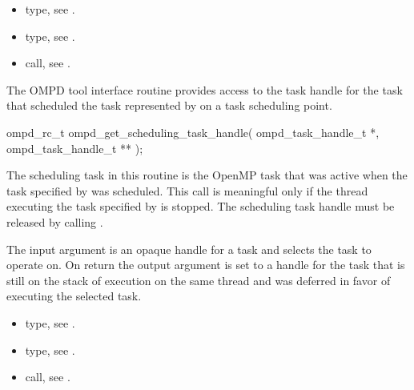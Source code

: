 \crossreferences
\begin{itemize}
  \item {} type, see .
	\item {} type, see .
	\item {} call, see 
	.
\end{itemize}


\label{subsubsubsec:ompd_get_scheduling_task_handle}
\summary
The OMPD tool interface routine  provides access to 
the task handle for the task that scheduled the task represented by  on 
a task scheduling point.

\format

\begin{cspecific}
\begin{ompSyntax}
ompd_rc_t ompd_get_scheduling_task_handle(
  ompd_task_handle_t *,
  ompd_task_handle_t **
);
\end{ompSyntax}
\end{cspecific}


\descr
The scheduling task in this routine is the OpenMP task that was active when
the task specified by  was scheduled. 
This call is meaningful only if the thread executing the task specified
by   is stopped. 
The scheduling task handle must be released by calling .

\argdesc
The input argument  is an opaque handle for a task and selects the task to operate on.
On return the output argument  is set to a handle for the 
task that is
still on the stack of execution on the same thread and was deferred in favor of executing the selected task.

\crossreferences
\begin{itemize}
  \item {} type, see .
	\item {} type, see .
	\item {} call, see .
\end{itemize}

